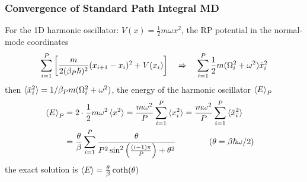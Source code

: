 \begin{frame}
  \frametitle{Convergence of Standard Path Integral MD}

  For the 1D harmonic oscillator: $V(x) = \frac{1}{2}m\omega x^2$, the RP
  potential in the normal-mode coordinates
  \begin{equation*}
    \sum_{i=1}^P \left[
    {m\over2(\beta_P\hbar)^2} (x_{\tikzmark{ring_polymer_bc} i+1} - x_i)^2
    +
    V(x_i)
    \right]
          \quad\Rightarrow\quad
    \sum_{i=1}^P {1\over2}m(\Omega_i^2 + \omega^2)\tilde{x}_i^2
  \end{equation*}
  then $\braket{\tilde{x}_i^2} = 1 / \beta_P m(\Omega_i^2 + \omega^2)$, the energy
  of the harmonic oscillator $\braket{E}_P$
  \begin{align*}
    \braket{E}_P &= 2\cdot {1\over2}m\omega^2\braket{x^2} =
                                                           {m\omega^2\over P}
                                                           \sum_{i=1}^P\braket{x_i^2}
                                                           = 
                                                           {m\omega^2\over P}
                                                           \sum_{i=1}^P\braket{\tilde{x}_i^2}
                                                           \cr
                                                           &=
                                                             \frac{\theta}{\beta}
                                                             \sum_{i=1}^P \frac{
                                                             \theta
                                                             }{
                                                             P^2\sin^2\left({(i-1)\pi\over
                                                             P}\right) + \theta^2
                                                             }\qquad\qquad
                                                             (\theta = \beta\hbar\omega / 2)
  \end{align*}
  the exact solution is $\braket{E} = {\theta\over\beta}\coth(\theta)$

  \begin{multicols}{2}
    \begin{itemize}


\end{itemize}
\end{multicols}
\end{frame}
